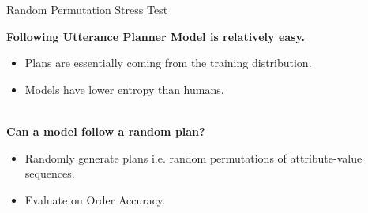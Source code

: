 

\begin{frame}{Random Permutation Stress Test}

    {\Large \textbf{Following Utterance Planner Model is relatively easy.}}\\
    \begin{itemize}
        \item Plans are essentially coming from the training distribution.
        \item Models have lower entropy than humans.
    \end{itemize}~\\

    {\Large \textbf{Can a model follow a random plan?}}
        \begin{itemize}
               \item Randomly generate plans i.e. random permutations of attribute-value sequences.
               \item Evaluate on Order Accuracy. 
           \end{itemize}
        

\end{frame}

